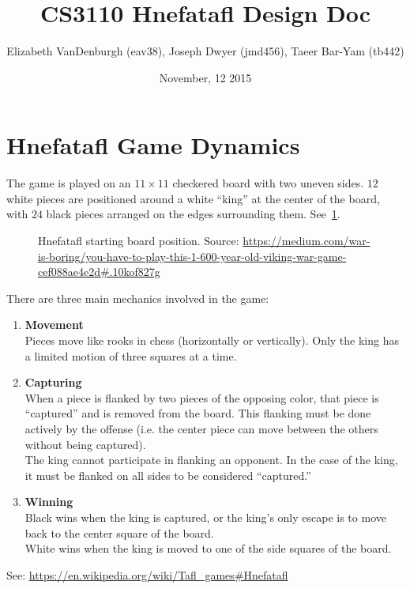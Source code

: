 \documentclass{article}
\title{CS3110 Hnefatafl Design Doc}
\author{Elizabeth VanDenburgh (eav38), Joseph Dwyer (jmd456), Taeer Bar-Yam (tb442)}
\date{November, 12 2015}
\begin{document}
\maketitle

\section{Hnefatafl Game Dynamics}
The game is played on an $11\times 11$ checkered board with two uneven sides.
$12$ white pieces are positioned around a white ``king'' at the center of the
board, with $24$ black pieces arranged on the edges surrounding them.
See~\ref{fig:initial_position}.
\begin{figure}
  \label{fig:initial_position}
  \centering
    \caption{Hnefatafl starting board position. Source: \url{https://medium.com/war-is-boring/you-have-to-play-this-1-600-year-old-viking-war-game-cef088ae4e2d\#.10kof827g}}
\end{figure}
There are three main mechanics involved in the game:
\begin{enumerate}
\item \textbf{Movement}\\
  Pieces move like rooks in chess (horizontally or vertically).
  Only the king has a limited motion of three squares at a time.
\item \textbf{Capturing}\\
  When a piece is flanked by two pieces of the opposing color, that piece is
  ``captured'' and is removed from the board.  This flanking must be done actively
  by the offense (i.e. the center piece can move between the others without
  being captured).\\
  The king cannot participate in flanking an opponent. In the case of the king,
  it must be flanked on all sides to be considered ``captured.''
\item \textbf{Winning}\\
  Black wins when the king is captured, or the king's only escape is to move
  back to the center square of the board.\\
  White wins when the king is moved to one of the side squares of the board.
\end{enumerate}
See: \url{https://en.wikipedia.org/wiki/Tafl\_games\#Hnefatafl}
\end{document}
